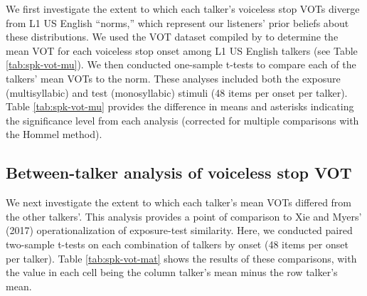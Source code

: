 \documentclass[preprint, 3p, authoryear]{elsarticle} %
\begin{document}
We first investigate the extent to which each talker's voiceless stop VOTs diverge from L1 US English ``norms,'' which represent our listeners' prior beliefs about these distributions.
We used the VOT dataset compiled by \citet{chodroff2019} to determine the mean VOT for each voiceless stop onset among L1 US English talkers (see Table \ref{tab:spk-vot-mu}).
We then conducted one-sample t-tests to compare each of the talkers' mean VOTs to the norm.
These analyses included both the exposure (multisyllabic) and test (monosyllabic) stimuli (48 items per onset per talker).
Table \ref{tab:spk-vot-mu} provides the difference in means and asterisks indicating the significance level from each analysis (corrected for multiple comparisons with the Hommel method).

\begin{table}

\caption{\label{tab:spk-vot-mu}Mean difference between L1 US English and talker mean VOTs by onset. Asterisks indicate significance levels from two-sample t-tests: *** < .001, ** < .01, * < .05. English means from Chodroff and Wilson (2019).}
\centering
{}
\end{table}

\hypertarget{between-talker-analysis-of-voiceless-stop-vot}{%
\subsection{Between-talker analysis of voiceless stop VOT}\label{between-talker-analysis-of-voiceless-stop-vot}}

We next investigate the extent to which each talker's mean VOTs differed from the other talkers'.
This analysis provides a point of comparison to Xie and Myers' (2017) operationalization of exposure-test similarity.
Here, we conducted paired two-sample t-tests on each combination of talkers by onset (48 items per onset per talker).
Table \ref{tab:spk-vot-mat} shows the results of these comparisons, with the value in each cell being the column talker's mean minus the row talker's mean.
\end{document}
